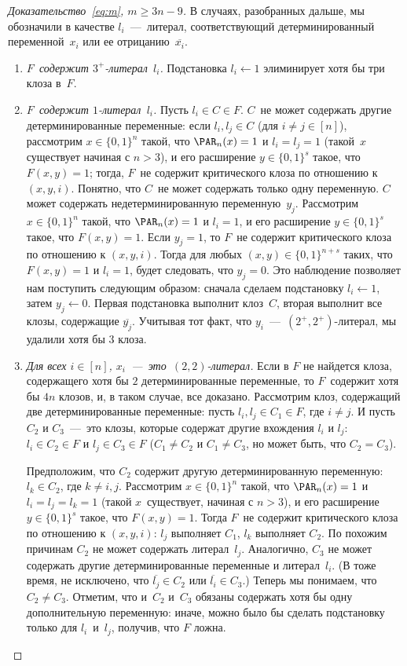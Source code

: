 \begin{proof}[Доказательство~\eqref{eq:m}, $m \ge 3n-9$]
	В случаях, разобранных дальше, мы обозначили
	в качестве $l_i$~---~литерал, соответствующий детерминированный переменной~$x_i$ или ее отрицанию~$\overline{x_i}$.
	\begin{enumerate}
		\item \emph{$F$~содержит $3^+$-литерал~$l_i$.} Подстановка $l_i \gets 1$ элиминирует хотя бы три клоза в~$F$.
		
		\item \emph{$F$~содержит $1$-литерал~$l_i$.} 
		Пусть $l_i \in C \in F$. $C$~не может содержать другие детерминированные переменные: 
		если $l_i, l_j \in C$ (для $i \neq j \in [n]$), рассмотрим $x \in \{0,1\}^n$ такой, что
		$\PAR_n(x)=1$ и $l_i=l_j=1$ (такой~$x$ существует начиная с $n > 3$), 
		и его расширение $y \in \{0,1\}^s$ такое, что $F(x,y)=1$; тогда, $F$~не содержит
		критического клоза по отношению к $(x,y,i)$. 
		Понятно, что $C$~не может содержать только одну переменную. 
		$C$ может содержать недетерминированную переменную~$y_j$.
		Рассмотрим $x \in \{0,1\}^n$ такой, что $\PAR_n(x)=1$ и $l_i=1$, 
		и его расширение $y \in \{0,1\}^s$ такое, что $F(x,y)=1$. 
		Если $y_j=1$, то $F$~не содержит критического клоза по отношению к $(x,y,i)$. 
		Тогда для любых $(x,y) \in \{0,1\}^{n+s}$ таких, что $F(x,y)=1$ и $l_i=1$, 
		будет следовать, что $y_j=0$. 
		Это наблюдение позволяет нам поступить следующим образом: 
		сначала сделаем подстановку $l_i \gets 1$, затем $y_j \gets 0$. 
		Первая подстановка выполнит клоз~$C$, вторая выполнит все клозы, содержащие $\overline{y_j}$. 
		Учитывая тот факт, что $y_i$~---~$(2^+, 2^+)$-литерал, мы удалили хотя бы $3$ клоза.
		
		\item\label{case:three} \emph{Для всех $i \in [n]$, $x_i$~---~это~$(2,2)$-литерал.} Если в $F$ не найдется клоза, содержащего хотя бы $2$ детерминированные переменные, 
		то $F$~содержит хотя бы $4n$ клозов, и, в таком случае, все доказано.
		Рассмотрим клоз, содержащий две детерминированные переменные:
		пусть $l_i,l_j \in C_1 \in F$, где $i \neq j$.
		И пусть $C_2$ и $C_3$~---~это клозы, которые содержат другие вхождения $l_i$ и $l_j$:
		$l_i \in C_2 \in F$ и $l_j \in C_3 \in F$ 
		($C_1 \neq C_2$ и $C_1 \neq C_3$, но может быть, что $C_2=C_3$).
		
		Предположим, что $C_2$ содержит другую детерминированную переменную: $l_k \in C_2$, где $k \neq i,j$.
		Рассмотрим $x \in \{0,1\}^n$ такой, что $\PAR_n(x)=1$ и $l_i=l_j=l_k=1$
		(такой $x$~существует, начиная с $n>3$), и его расширение $y \in \{0,1\}^s$ такое, что $F(x,y)=1$. Тогда $F$~не содержит критического клоза по отношению к $(x,y,i)$:
		$l_j$ выполняет $C_1$, $l_k$ выполняет $C_2$. 
		По похожим причинам $C_2$ не может содержать литерал~$l_j$. 
		Аналогично, $C_3$ не может содержать другие детерминированные переменные и литерал~$l_i$.
		(В тоже время, не исключено, что $\overline{l_j} \in C_2$ или
		$\overline{l_i} \in C_3$.)
		Теперь мы понимаем, что $C_2 \neq C_3$. 
		Отметим, что и~$C_2$ и~$C_3$ обязаны содержать хотя бы одну дополнительную переменную:
		иначе, можно было бы сделать подстановку только для $l_i$~и~$l_j$, получив, что $F$ ложна.
		

\end{enumerate}
\end{proof}
